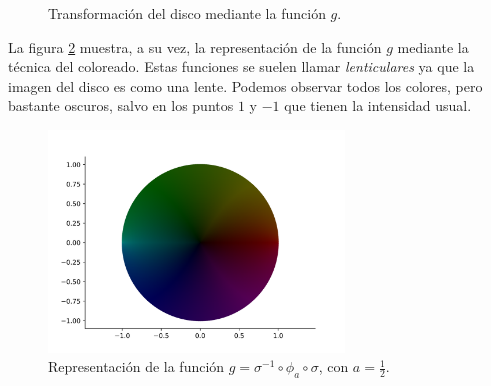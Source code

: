 \begin{example}
\begin{figure}[!htbp]
        \caption{Transformación del disco mediante la función $g$.}
        \label{fig:ejemplo}
    \end{figure}

    La figura \ref{fig:lente} muestra, a su vez, la representación de la función $g$ mediante la técnica del coloreado. Estas funciones se suelen llamar \textit{lenticulares} ya que la imagen del disco es como una lente. Podemos observar todos los colores, pero bastante oscuros, salvo en los puntos $1$ y $-1$ que tienen la intensidad usual. \\

    \begin{figure}[!htbp]
        \centering
        \includegraphics[width=0.7\textwidth]{../Aplicacion/lente.png}
        \caption{Representación de la función $g = \sigma^{-1} \circ \phi_a \circ \sigma$, con $a = \frac{1}{2}$.}
        \label{fig:lente}
    \end{figure}
\end{example}

